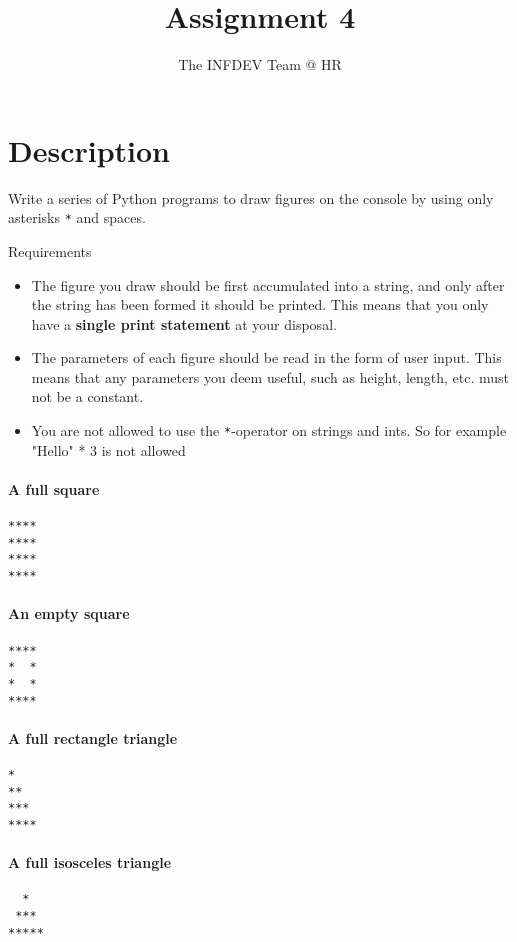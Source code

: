 \documentclass[10pt,a4paper,final]{article}
\author{The INFDEV Team @ HR}
\title{Assignment 4}
\begin{document}
\section{Description}
Write a series of Python programs to draw figures on the console by using only asterisks \texttt{*} and spaces. 

{\large Requirements}
\begin{itemize}
\item The figure you draw should be first accumulated into a string, and only after the string has been formed it should be printed. This means that you only have a \textbf{single print statement} at your disposal.
\item The parameters of each figure should be read in the form of user input. This means that any parameters you deem useful, such as height, length, etc. must not be a constant.
\item You are not allowed to use the \texttt{*}-operator on strings and ints. So for example "Hello" * 3 is not allowed
\end{itemize}

\paragraph*{A full square}
\begin{lstlisting}
****
****
****
****
\end{lstlisting}

\paragraph*{An empty square}
\begin{lstlisting}
****
*  *
*  *
****
\end{lstlisting}

\paragraph*{A full rectangle triangle}
\begin{lstlisting}
*
**
***
****
\end{lstlisting}

\paragraph*{A full isosceles triangle}
\begin{lstlisting}
  *
 ***
*****
\end{lstlisting}
\end{document}
